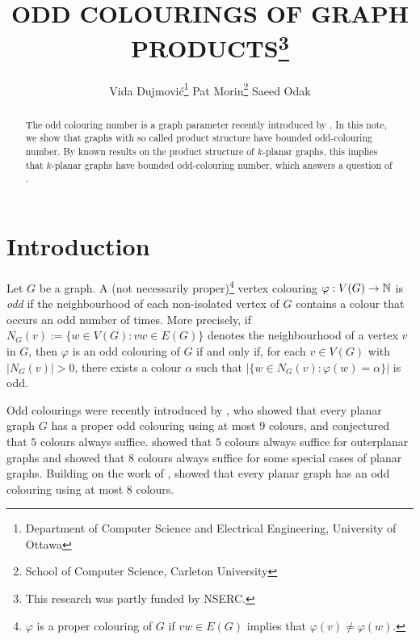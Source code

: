 \documentclass{patmorin}
\title{\MakeUppercase{Odd Colourings of Graph Products}\thanks{This research was partly funded by NSERC.}}
\author{%
  Vida Dujmović\thanks{Department of Computer Science and Electrical Engineering, University of Ottawa}\qquad
  Pat Morin\thanks{School of Computer Science, Carleton University}\qquad
  Saeed Odak\footnotemark[1]
}
\date{}
\begin{document}
\maketitle

\begin{abstract}
  The odd colouring number is a graph parameter recently introduced by \citet{petrusevski.skrekovski:colorings}.  In this note, we show that graphs with so called product structure have bounded odd-colouring number. By known results on the product structure of $k$-planar graphs, this implies that $k$-planar graphs have bounded odd-colouring number, which answers a question of \citet{cranston.lafferty.ea:note}.
\end{abstract}

%

\section{Introduction}

Let $G$ be a graph.  A (not necessarily proper)\footnote{$\varphi$ is a proper colouring of $G$ if $vw\in E(G)$ implies that $\varphi(v)\neq\varphi(w)$.} vertex colouring $\varphi:V(G)\to\mathbb{N}$ is \emph{odd} if the neighbourhood of each non-isolated vertex of $G$ contains a colour that occurs an odd number of times.  More precisely, if $N_G(v):=\{w\in V(G):vw\in E(G)\}$ denotes the neighbourhood of a vertex $v$ in $G$, then $\varphi$ is an odd colouring of $G$ if and only if, for each $v\in V(G)$ with $|N_G(v)|>0$, there exists a colour $\alpha$ such that $|\{w\in N_G(v): \varphi(w)=\alpha\}|$ is odd.

Odd colourings were recently introduced by \citet{petrusevski.skrekovski:colorings}, who showed that every planar graph $G$ has a proper odd colouring using at most $9$ colours, and conjectured that $5$ colours always suffice.  \citet{caro.petrusevski.ea:remarks} showed that $5$ colours always suffice for outerplanar graphs and showed that $8$ colours always suffice for some special cases of planar graphs.  Building on the work of \citet{caro.petrusevski.ea:remarks}, \citet{petr.portier:odd} showed that every planar graph has an odd colouring using at most $8$ colours.
\end{document}
